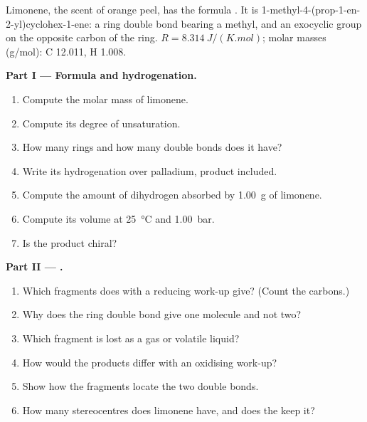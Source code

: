 \begin{problem}
\label{pb:b2:alkene-redox:1}
Limonene, the scent of orange peel, has the formula . It is
1-methyl-4-(prop-1-en-2-yl)cyclohex-1-ene: a ring double bond bearing a methyl, and an
exocyclic  group on the opposite carbon of the ring. $R =
\qty{8.314}{J/(K.mol)}$; molar masses (\unit{g/mol}): C 12.011, H 1.008.

\medskip
\noindent\textbf{Part I --- Formula and hydrogenation.}
\begin{enumerate}
  \item Compute the molar mass of limonene.
  \item Compute its degree of unsaturation.
  \item How many rings and how many double bonds does it have?
  \item Write its hydrogenation over palladium, product included.
  \item Compute the amount of dihydrogen absorbed by \qty{1.00}{g} of limonene.
  \item Compute its volume at \qty{25}{\degreeCelsius} and \qty{1.00}{bar}.
  \item Is the product chiral?
\end{enumerate}

\medskip
\noindent\textbf{Part II --- .}
\begin{enumerate}[resume]
  \item Which fragments does  with a reducing work-up give? (Count the carbons.)
  \item Why does the ring double bond give one molecule and not two?
  \item Which fragment is lost as a gas or volatile liquid?
  \item How would the products differ with an oxidising work-up?
  \item Show how the fragments locate the two double bonds.
  \item How many stereocentres does limonene have, and does the  keep it?
\end{enumerate}


\end{problem}
